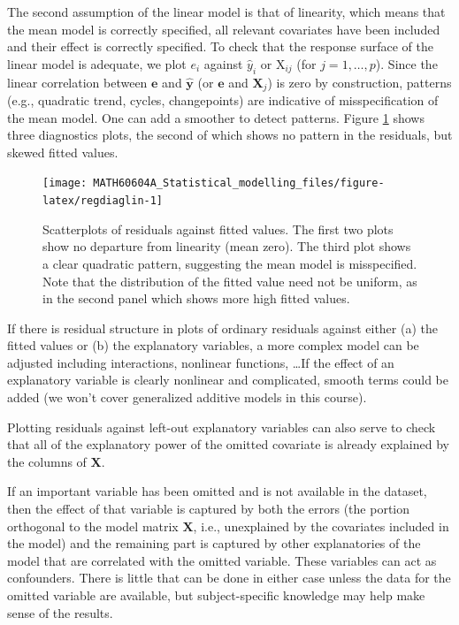 \documentclass[
  11pt,
  letterpaper,
]{book}
\theoremstyle{definition}
\theoremstyle{definition}
\theoremstyle{definition}
\theoremstyle{remark}
\begin{document}
The second assumption of the linear model is that of linearity, which means that the mean model is correctly specified, all relevant covariates have been included and their effect is correctly specified.
To check that the response surface of the linear model is adequate, we plot \(e_i\) against \(\widehat{y}_i\) or \(\mathrm{X}_{ij}\) (for \(j=1, \ldots, p\)). Since the linear correlation between \(\boldsymbol{e}\) and \(\widehat{\boldsymbol{y}}\) (or \(\boldsymbol{e}\) and \(\mathbf{X}_j\)) is zero by construction, patterns (e.g., quadratic trend, cycles, changepoints) are indicative of misspecification of the mean model. One can add a smoother to detect patterns. Figure \ref{fig:regdiaglin} shows three diagnostics plots, the second of which shows no pattern in the residuals, but skewed fitted values.

\begin{figure}

{\centering \texttt{[image: MATH60604A\_Statistical\_modelling\_files/figure-latex/regdiaglin-1]} 

}

\caption{Scatterplots of residuals against fitted values. The first two plots show no departure from linearity (mean zero). The third plot shows a clear quadratic pattern, suggesting the mean model is misspecified. Note that the distribution of the fitted value need not be uniform, as in the second panel which shows more high fitted values.}\label{fig:regdiaglin}
\end{figure}

If there is residual structure in plots of ordinary residuals against either (a) the fitted values or (b) the explanatory variables, a more complex model can be adjusted including interactions, nonlinear functions, \ldots If the effect of an explanatory variable is clearly nonlinear and complicated, smooth terms could be added (we won't cover generalized additive models in this course).

Plotting residuals against left-out explanatory variables can also serve to check that all of the explanatory power of the omitted covariate is already explained by the columns of \(\mathbf{X}\).

If an important variable has been omitted and is not available in the dataset, then the effect of that variable is captured by both the errors (the portion orthogonal to the model matrix \(\mathbf{X}\), i.e., unexplained by the covariates included in the model) and the remaining part is captured by other explanatories of the model that are correlated with the omitted variable. These variables can act as confounders. There is little that can be done in either case unless the data for the omitted variable are available, but subject-specific knowledge may help make sense of the results.
\end{document}

